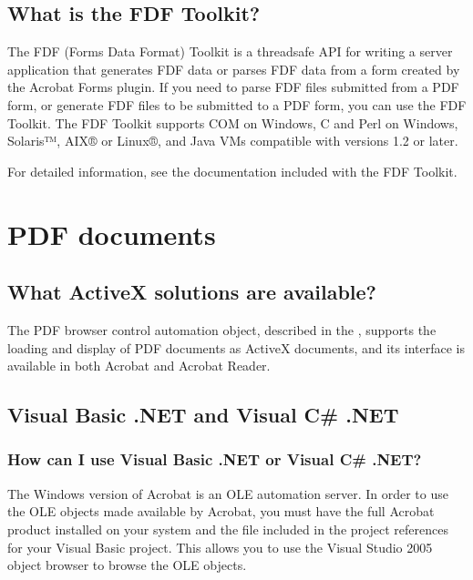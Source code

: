 \documentclass[letterpaper,12pt,english,openany,oneside]{sphinxmanual}
\begin{document}
\subsection{What is the FDF Toolkit?}
\label{\detokenize{apxDevFAQ:what-is-the-fdf-toolkit}}
The FDF (Forms Data Format) Toolkit is a thread\sphinxhyphen{}safe API for writing a server application that generates FDF data or parses FDF data from a form created by the Acrobat Forms plug\sphinxhyphen{}in. If you need to parse FDF files submitted from a PDF form, or generate FDF files to be submitted to a PDF form, you can use the FDF Toolkit. The FDF Toolkit supports COM on Windows, C and Perl on Windows, Solaris™, AIX® or Linux®, and Java VMs compatible with versions 1.2 or later.

For detailed information, see the documentation included with the FDF Toolkit.




\section{PDF documents}
\label{\detokenize{apxDevFAQ:pdf-documents}}

\subsection{What ActiveX solutions are available?}
\label{\detokenize{apxDevFAQ:what-activex-solutions-are-available}}
The PDF browser control automation object, described in the  , supports the loading and display of PDF documents as ActiveX documents, and its interface is available in both Acrobat and Acrobat Reader.


\subsection{Visual Basic .NET and Visual C\# .NET}
\label{\detokenize{apxDevFAQ:visual-basic-net-and-visual-c-net}}

\subsubsection{How can I use Visual Basic .NET or Visual C\# .NET?}
\label{\detokenize{apxDevFAQ:how-can-i-use-visual-basic-net-or-visual-c-net}}
The Windows version of Acrobat is an OLE automation server. In order to use the OLE objects made available by Acrobat, you must have the full Acrobat product installed on your system and the  file included in the project references for your Visual Basic project. This allows you to use the Visual Studio 2005 object browser to browse the OLE objects.
\end{document}
